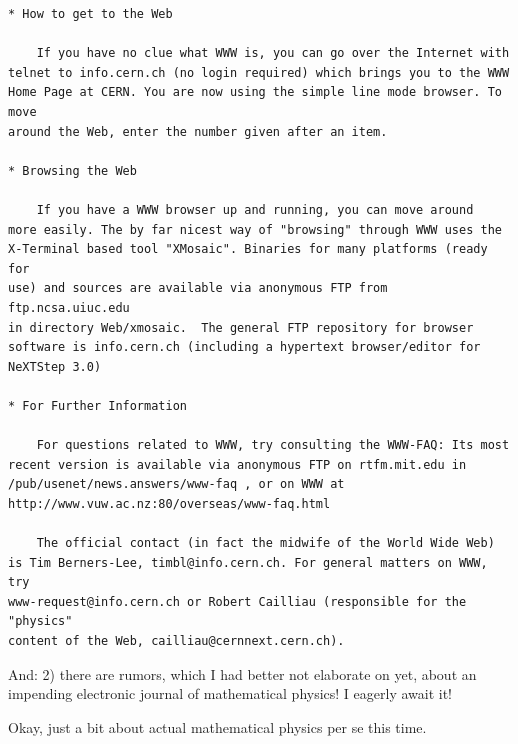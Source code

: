 \documentclass[12pt]{article}
\begin{document}
\begin{verbatim}
* How to get to the Web

    If you have no clue what WWW is, you can go over the Internet with
telnet to info.cern.ch (no login required) which brings you to the WWW 
Home Page at CERN. You are now using the simple line mode browser. To move 
around the Web, enter the number given after an item. 

* Browsing the Web

    If you have a WWW browser up and running, you can move around
more easily. The by far nicest way of "browsing" through WWW uses the
X-Terminal based tool "XMosaic". Binaries for many platforms (ready for
use) and sources are available via anonymous FTP from ftp.ncsa.uiuc.edu
in directory Web/xmosaic.  The general FTP repository for browser
software is info.cern.ch (including a hypertext browser/editor for
NeXTStep 3.0)

* For Further Information

    For questions related to WWW, try consulting the WWW-FAQ: Its most 
recent version is available via anonymous FTP on rtfm.mit.edu in 
/pub/usenet/news.answers/www-faq , or on WWW at 
http://www.vuw.ac.nz:80/overseas/www-faq.html

    The official contact (in fact the midwife of the World Wide Web) 
is Tim Berners-Lee, timbl@info.cern.ch. For general matters on WWW, try 
www-request@info.cern.ch or Robert Cailliau (responsible for the "physics" 
content of the Web, cailliau@cernnext.cern.ch).
\end{verbatim}

And: 2) there are rumors, which I had better not elaborate on yet, about
an impending electronic journal of mathematical physics! I eagerly await
it!

Okay, just a bit about actual mathematical physics per se this time.
\end{document}
